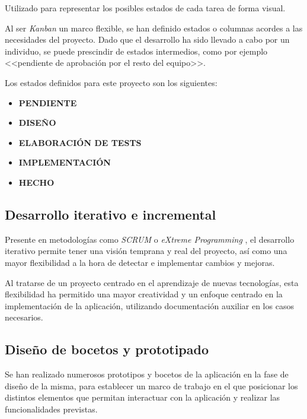 \documentclass[10pt, a4paper]{aqademic}
\begin{document}
Utilizado para representar los posibles estados de cada tarea de forma visual.

\medskip

Al ser \textit{Kanban} un marco flexible, se han definido estados o columnas acordes a las necesidades del proyecto. Dado que el desarrollo ha sido llevado a cabo por un individuo, se puede prescindir de estados intermedios, como por ejemplo <<pendiente de aprobación por el resto del equipo>>.

\medskip

Los estados definidos para este proyecto son los siguientes:

\begin{itemize}
	\item \textbf{PENDIENTE}
	\item \textbf{DISEÑO}
	\item \textbf{ELABORACIÓN DE TESTS}
	\item \textbf{IMPLEMENTACIÓN}
	\item \textbf{HECHO}
\end{itemize}


\subsection*{Desarrollo iterativo e incremental}

Presente en metodologías como \textit{SCRUM} \cite{Schwaber04} o \textit{eXtreme Programming} \cite{BecAnd04extreme}, el desarrollo iterativo permite tener una visión temprana y real del proyecto, así como una mayor flexibilidad a la hora de detectar e implementar cambios y mejoras.

\medskip

Al tratarse de un proyecto centrado en el aprendizaje de nuevas tecnologías, esta flexibilidad ha permitido una mayor creatividad y un enfoque centrado en la implementación de la aplicación, utilizando documentación auxiliar en los casos necesarios.


\subsection*{Diseño de bocetos y prototipado}

Se han realizado numerosos prototipos y bocetos de la aplicación en la fase de diseño de la misma, para establecer un marco de trabajo en el que posicionar los 
distintos elementos que permitan interactuar con la aplicación y realizar las funcionalidades previstas.
\end{document}
